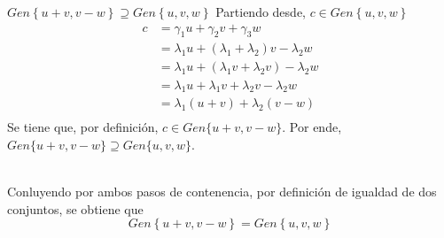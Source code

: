 \documentclass{article}
\begin{document}
\begin{enumerate}
\begin{mathcase}{\(Gen\left\{u + v, v - w\right\} \supseteq Gen\left\{u, v, w\right\}\)}
            Partiendo desde, \(c \in Gen\left\{u, v, w\right\}\)
            \[
                \begin{aligned}
                    c &= \gamma_1u + \gamma_2v + \gamma_3w \\
                    &= \lambda_1u + \left(\lambda_1 + \lambda_2\right)v - \lambda_2w \\
                    &= \lambda_1u + \left(\lambda_1v + \lambda_2v\right) - \lambda_2w \\
                    &= \lambda_1u + \lambda_1v + \lambda_2v - \lambda_2w \\ 
                    &= \lambda_1\left(u + v\right) + \lambda_2\left(v - w\right) \\
                \end{aligned}
            \]
            Se tiene que, por definición, \(c \in Gen\{u + v, v - w\}\). 
            Por ende, \(Gen\{u + v, v - w\} \supseteq Gen\{u, v, w\}\).
        \end{mathcase}
        \\
        Conluyendo por ambos pasos de contenencia, por definición de igualdad de dos conjuntos, se obtiene que
        \[
            Gen\left\{u + v, v - w\right\} = Gen\left\{u, v, w\right\}
        \]


\end{enumerate}
\end{document}
